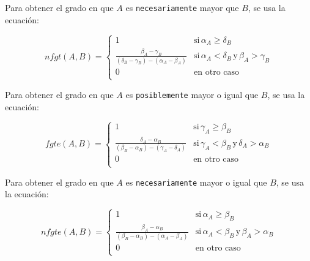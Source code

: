 \begin{definition}
Para obtener el grado en que $A$ es \texttt{necesariamente} mayor que $B$, se usa la ecuación:

\begin{equation}
    nfgt(A,B) = \left\{ { \begin{array}{ll}
                    1 & \text{si}\, \alpha_A \geq \delta_B \\ 
                    \frac{\beta_A - \gamma_B}{(\delta_B - \gamma_B)-(\alpha_A - \beta_A)} & \text{si}\, \alpha_A < \delta_B \, \text{y} \, \beta_A > \gamma_B \\
                    0 & \text{en otro caso} \\ 
                    \end{array}  } \right.
\end{equation}
\end{definition}

\begin{definition}
Para obtener el grado en que $A$ es \texttt{posiblemente} mayor o igual que $B$, se usa la ecuación:

\begin{equation}
    fgte(A,B) = \left\{ { \begin{array}{ll}
                    1 & \text{si}\, \gamma_A \geq \beta_B \\ 
                    \frac{\delta_A - \alpha_B}{(\beta_B - \alpha_B)-(\gamma_A - \delta_A)} & \text{si}\, \gamma_A < \beta_B \, \text{y} \, \delta_A > \alpha_B \\
                    0 & \text{en otro caso} \\ 
                    \end{array}  } \right.
\end{equation}
\end{definition}

\begin{definition}
Para obtener el grado en que $A$ es \texttt{necesariamente} mayor o igual que $B$, se usa la ecuación:

\begin{equation}
    nfgte(A,B) = \left\{ { \begin{array}{ll}
                    1 & \text{si}\, \alpha_A \geq \beta_B \\ 
                    \frac{\beta_A - \alpha_B}{(\beta_B - \alpha_B)-(\alpha_A - \beta_A)} & \text{si}\, \alpha_A < \beta_B \, \text{y} \, \beta_A > \alpha_B \\
                    0 & \text{en otro caso} \\ 
                    \end{array}  } \right.
\end{equation}
\end{definition}

